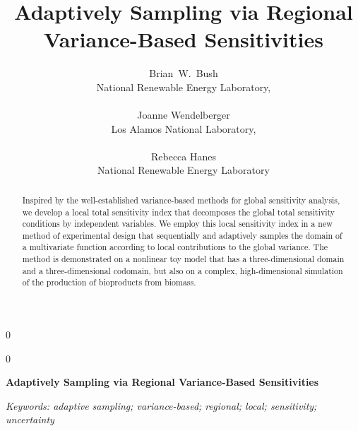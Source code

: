 \documentclass[12pt]{article}
\newcommand{\blind}{0}
\begin{document}
%

\def\spacingset#1{\renewcommand{\baselinestretch}%
{#1}\small\normalsize} \spacingset{1}



\blind
{
  \title{\bf Adaptively Sampling via Regional Variance-Based Sensitivities}
  \author{
    Brian\ W.\ Bush \\
    National Renewable Energy Laboratory, \\ \\
    Joanne Wendelberger \\
    Los Alamos National Laboratory, \\ \\
    Rebecca Hanes \\
    National Renewable Energy Laboratory
  }
  \maketitle
} \fi

\blind
{
  \bigskip
  \bigskip
  \bigskip
  \begin{center}
    {\LARGE\bf Adaptively Sampling via Regional Variance-Based Sensitivities}
\end{center}
  \medskip
} \fi

\bigskip
\begin{abstract}
Inspired by the well-established variance-based methods for global sensitivity analysis, we develop a local total sensitivity index that decomposes the global total sensitivity conditions by independent variables. We employ this local sensitivity index in a new method of experimental design that sequentially and adaptively samples the domain of a multivariate function according to local contributions to the global variance. The method is demonstrated on a nonlinear toy model that has a three-dimensional domain and a three-dimensional codomain, but also on a complex, high-dimensional simulation of the production of bioproducts from biomass. 
\end{abstract}

\noindent%
{\it Keywords: adaptive sampling; variance-based; regional; local; sensitivity; uncertainty} 
\vfill

\newpage
\end{document}
